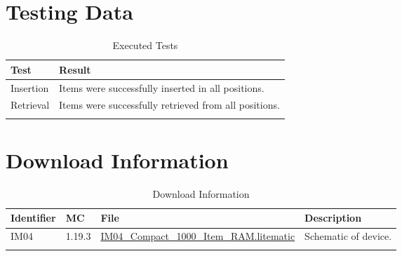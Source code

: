 \documentclass[10pt]{datasheet}
\begin{document}
\section{Testing Data}

\begin{table}[H]
\caption{Executed Tests}
\begin{tabularx}{\textwidth}{l | X}
    \thickhline
    \textbf{Test} & \textbf{Result} \\
    \hline
    Insertion & Items were successfully inserted in all positions. \\
    \hline
    Retrieval & Items were successfully retrieved from all positions. \\
    \thickhline
\end{tabularx}
\end{table}

\section{Download Information}
\begin{table}[H]
    \caption{Download Information}
    \begin{tabularx}{\textwidth}{l | l | l | X}
        \thickhline
        \textbf{Identifier} & \textbf{MC} & \textbf{File} & \textbf{Description} \\
        \hline
        IM04 & 1.19.3 & \href{https://github.com/Soontech-Annals/Archive/blob/8413f90a054b6c415703bae02badeba7541344f6/Archive/item-memory/IM04\%20Compact\%201000\%20Item\%20RAM/IM04\_Compact\_1000\_Item\_RAM.litematic?raw=1}{IM04\_Compact\_1000\_Item\_RAM.litematic} & Schematic of device. \\
        \hline
        \thickhline
    \end{tabularx}
\end{table}
\end{document}
